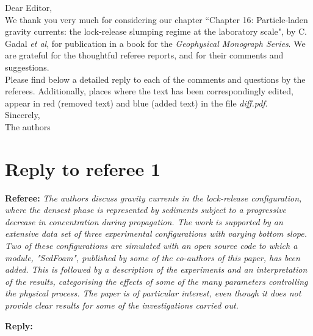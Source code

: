 \documentclass[12pt]{article}
\newcommand{\MajorReply}[2]{\noindent
\textbf{Referee:}
\emph{#1}

\medskip
\noindent\textbf{Reply:} {\color{blue}#2}
\vspace*{0.4 cm}}
\begin{document}
\noindent Dear Editor,\\

\noindent We thank you very much for considering our chapter ``Chapter 16: Particle-laden gravity currents: the lock-release slumping regime at the laboratory scale", by C. Gadal \emph{et al}, for publication in a book for the \emph{Geophysical Monograph Series}. We are grateful for the thoughtful referee reports, and for their comments and suggestions. \\

\noindent
Please find below a detailed reply to each of the comments and questions by the referees. Additionally, places where the text has been correspondingly edited, appear in red (removed text) and blue (added text) in the file \emph{diff.pdf}. \\

\noindent Sincerely, \\

\noindent The authors


\newpage
\section{Reply to referee 1}

\MajorReply{The authors discuss gravity currents in the lock-release configuration, where the densest phase is represented by sediments subject to a progressive decrease in concentration during propagation. The work is supported by an extensive data set of three experimental configurations with varying bottom slope. Two of these configurations are simulated with an open source code to which a module, "SedFoam", published by some of the co-authors of this paper, has been added. This is followed by a description of the experiments and an interpretation of the results, categorising the effects of some of the many parameters controlling the physical process. The paper is of particular interest, even though it does not provide clear results for some of the investigations carried out.
}{}
\end{document}
